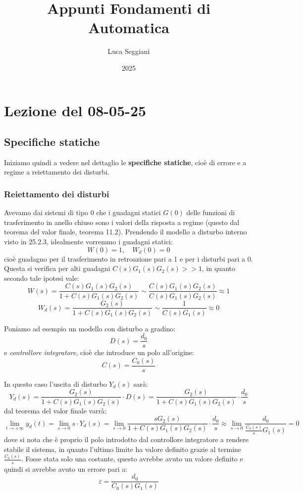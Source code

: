 \documentclass[a4paper,11pt]{article}
\title{Appunti Fondamenti di Automatica}
\author{Luca Seggiani}
\date{2025}
\begin{document}
\section{Lezione del 08-05-25}

\thispagestyle{empty}
\pagestyle{fancy}

\subsection{Specifiche statiche}
Iniziamo quindi a vedere nel dettaglio le \textbf{specifiche statiche}, cioè di errore e a regime a reiettamento dei disturbi.

\subsubsection{Reiettamento dei disturbi}
Avevamo dai sistemi di tipo 0 che i guadagni statici $G(0)$ delle funzioni di trasferimento in anello chiuso sono i valori della risposta a regime (questo dal teorema del valor finale, teorema 11.2).
Prendendo il modello a disturbo interno visto in 25.2.3, idealmente vorremmo i guadagni statici:
$$
W(0) = 1, \quad W_d(0) =0
$$
cioè guadagno per il trasferimento in retroazione pari a 1 e per i disturbi pari a 0.
Questa si verifica per alti guadagni $C(s) G_1(s) G_2(s) >> 1$, in quanto secondo tale ipotesi vale:
$$
W(s) = \frac{C(s) G_1(s) G_2(s)}{1 + C(s) G_1(s) G_2(s)} \sim \frac{C(s) G_1(s) G_2(s)}{C(s) G_1(s) G_2(s)} \approx 1
$$
$$
W_d(s) = \frac{G_2(s)}{1 + C(s) G_1(s) G_2(s)} \sim \frac{1}{C(s) G_1(s)} \approx 0
$$

\par\smallskip

Poniamo ad esempio un modello con disturbo a gradino:
$$
D(s) = \frac{d_0}{s}
$$
e \textit{controllore integratore}, cioè che introduce un polo all'origine:
$$
C(s) = \frac{C_0(s)}{s}
$$

In questo caso l'uscita di disturbo $Y_d(s)$ sarà:
$$
Y_d(s) = \frac{G_2(s)}{1 + C(s) G_1(s) G_2(s)} \cdot D(s) = \frac{G_2(s)}{1 + C(s) G_1(s) G_2(s)} \cdot \frac{d_0}{s}
$$
dal teorema del valor finale varrà:
$$
\lim_{t \rightarrow + \infty} y_d(t) = \lim_{s \rightarrow 0} s \cdot Y_d(s) = \lim_{s \rightarrow 0} \frac{s G_2(s)}{1 + C(s) G_1(s) G_2(s)} \cdot \frac{d_0}{s} \approx \lim_{s \rightarrow 0} \frac{d_0}{ \frac{C_0(s)}{s} G_1(s) } = 0
$$
dove si nota che è proprio il polo introdotto dal controllore integratore a rendere stabile il sistema, in quanto l'ultimo limite ha valore definito grazie al termine $\frac{C_0(s)}{s}$. 
Fosse stata solo una costante, questo avrebbe avuto un valore definito e quindi si avrebbe avuto un errore pari a:
$$
\varepsilon = \frac{d_0}{C_0(s) G_1(s)}
$$
\end{document}
